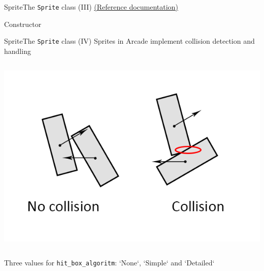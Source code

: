 \documentclass[10pt,compress]{beamer} %
\begin{document}
\begin{frame}{Sprite}{The \texttt{Sprite} class (III)}
	\href{https://api.arcade.academy/en/latest/api/sprites.html}{(Reference documentation)}

	\begin{block}{Constructor}
		\vspace{-0.2cm}
		
		\vspace{-0.2cm}
	\end{block}	

\end{frame}

\begin{frame}{Sprite}{The \texttt{Sprite} class (IV)}
    Sprites in Arcade implement \alert{collision detection} and handling

	\begin{columns}
		\includegraphics[width=\linewidth]{figs/collision}\\
	\end{columns}

 

    Three values for \texttt{hit\_box\_algoritm}: `None`, `Simple` and `Detailed`


\end{frame}
\end{document}
